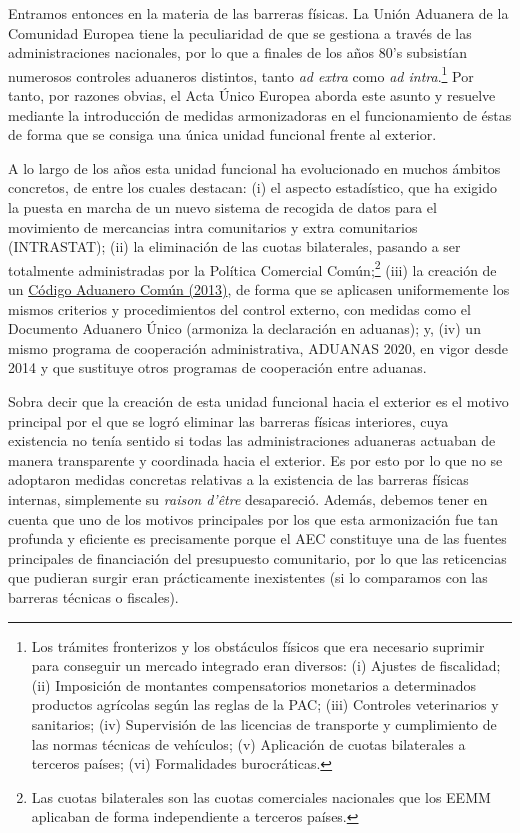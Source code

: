 \documentclass[10pt,a4paper]{article}
\begin{document}
Entramos entonces en la materia de las barreras físicas. La Unión Aduanera de la Comunidad Europea tiene la peculiaridad de que se gestiona a través de las administraciones nacionales, por lo que a finales de los años 80's subsistían numerosos controles aduaneros distintos, tanto \textit{ad extra} como \textit{ad intra}.\footnote{%
    Los trámites fronterizos y los obstáculos físicos que era necesario suprimir para conseguir un mercado integrado eran diversos: (i) Ajustes de fiscalidad; (ii) Imposición de montantes compensatorios monetarios a determinados productos agrícolas según las reglas de la PAC; (iii) Controles veterinarios y sanitarios; (iv) Supervisión de las licencias de transporte y cumplimiento de las normas técnicas de vehículos; (v) Aplicación de cuotas bilaterales a terceros países; (vi) Formalidades burocráticas.
} Por tanto, por razones obvias, el Acta Único Europea aborda este asunto y resuelve mediante la introducción de medidas armonizadoras en el funcionamiento de éstas de forma que se consiga una única unidad funcional frente al exterior. 

A lo largo de los años esta unidad funcional ha evolucionado en muchos ámbitos concretos, de entre los cuales destacan: (i) el aspecto estadístico, que ha exigido la puesta en marcha de un nuevo sistema de recogida de datos para el movimiento de mercancias intra comunitarios y extra comunitarios (INTRASTAT); (ii) la eliminación de las cuotas bilaterales, pasando a ser totalmente administradas por la Política Comercial Común;\footnote{%
    Las cuotas bilaterales son las cuotas comerciales nacionales que los EEMM aplicaban de forma independiente a terceros países.
} (iii) la creación de un \href{https://www.boe.es/buscar/doc.php?id=DOUE-L-2013-82033}{Código Aduanero Común (2013)}, de forma que se aplicasen uniformemente los mismos criterios y procedimientos del control externo, con medidas como el Documento Aduanero Único (armoniza la declaración en aduanas); y, (iv) un mismo programa de cooperación administrativa, ADUANAS 2020, en vigor desde 2014 y que sustituye otros programas de cooperación entre aduanas.

Sobra decir que la creación de esta unidad funcional hacia el exterior es el motivo principal por el que se logró eliminar las barreras físicas interiores, cuya existencia no tenía sentido si todas las administraciones aduaneras actuaban de manera transparente y coordinada hacia el exterior. Es por esto por lo que no se adoptaron medidas concretas relativas a la existencia de las barreras físicas internas, simplemente su \textit{raison d'être} desapareció. Además, debemos tener en cuenta que uno de los motivos principales por los que esta armonización fue tan profunda y eficiente es precisamente porque el AEC constituye una de las fuentes principales de financiación del presupuesto comunitario, por lo que las reticencias que pudieran surgir eran prácticamente inexistentes (si lo comparamos con las barreras técnicas o fiscales).
\end{document}
